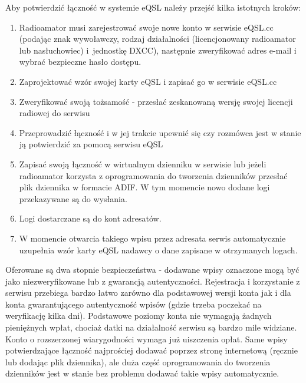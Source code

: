 \documentclass[]{mgr}
\begin{document}
            Aby potwierdzić łączność w systemie eQSL należy przejść kilka istotnych kroków:
            \begin{enumerate}
                \item Radioamator musi zarejestrować swoje nowe konto w serwisie eQSL.cc (podając znak wywoławczy, rodzaj działalności (licencjonowany radioamator lub nasłuchowiec) i~jednostkę DXCC), następnie zweryfikować adres e-mail i wybrać bezpieczne hasło dostępu.
                \item Zaprojektować wzór swojej karty eQSL i zapisać go w serwisie eQSL.cc
                \item Zweryfikować swoją tożsamość - przesłać zeskanowaną wersję swojej licencji radiowej do serwisu
                \item Przeprowadzić łączność i w jej trakcie upewnić się czy rozmówca jest w stanie ją potwierdzić za pomocą serwisu eQSL
                \item Zapisać swoją łączność w wirtualnym dzienniku w serwisie lub jeżeli radioamator korzysta z oprogramowania do tworzenia dzienników przesłać plik dziennika w formacie ADIF. W tym momencie nowo dodane logi przekazywane są do wysłania.
                \item Logi dostarczane są do kont adresatów.
                \item W momencie otwarcia takiego wpisu przez adresata serwis automatycznie uzupełnia wzór karty eQSL nadawcy o dane zapisane w otrzymanych logach.
            \end{enumerate}

            Oferowane są dwa stopnie bezpieczeństwa - dodawane wpisy oznaczone mogą być jako niezweryfikowane lub z gwarancją autentyczności. Rejestracja i korzystanie z serwisu przebiega bardzo łatwo zarówno dla podstawowej wersji konta jak i dla konta gwarantującego autentyczność wpisów (gdzie trzeba poczekać na weryfikację kilka dni). Podstawowe poziomy konta nie wymagają żadnych pieniężnych wpłat, chociaż datki na działalność serwisu są bardzo mile widziane. Konto o rozszerzonej wiarygodności wymaga już uiszczenia opłat. Same wpisy potwierdzające łączność najprościej dodawać poprzez stronę internetową (ręcznie lub dodając plik dziennika), ale duża część oprogramowania do tworzenia dzienników jest w stanie bez problemu dodawać takie wpisy automatycznie.
\end{document}
